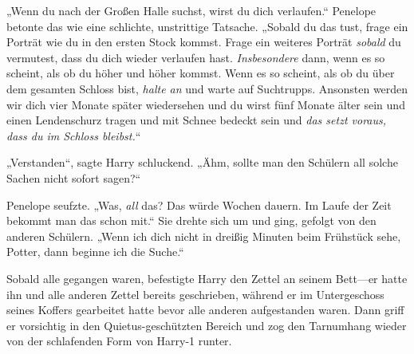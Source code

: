 „Wenn du nach der Großen Halle suchst, wirst du dich verlaufen.“ Penelope betonte das wie eine schlichte, unstrittige Tatsache. „Sobald du das tust, frage ein Porträt wie du in den ersten Stock kommst. Frage ein weiteres Porträt \emph{sobald} du vermutest, dass du dich wieder verlaufen hast. \emph{Insbesondere} dann, wenn es so scheint, als ob du höher und höher kommst. Wenn es so scheint, als ob du über dem gesamten Schloss bist, \emph{halte an} und warte auf Suchtrupps. Ansonsten werden wir dich vier Monate später wiedersehen und du wirst fünf Monate älter sein und einen Lendenschurz tragen und mit Schnee bedeckt sein und \emph{das setzt voraus, dass du \emph{im} Schloss bleibst.}“

„Verstanden“, sagte Harry schluckend. „Ähm, sollte man den Schülern all solche Sachen nicht sofort sagen?“

Penelope seufzte. „Was, \emph{all} das? Das würde Wochen dauern. Im Laufe der Zeit bekommt man das schon mit.“ Sie drehte sich um und ging, gefolgt von den anderen Schülern. „Wenn ich dich nicht in dreißig Minuten beim Frühstück sehe, Potter, dann beginne ich die Suche.“

Sobald alle gegangen waren, befestigte Harry den Zettel an seinem Bett—er hatte ihn und alle anderen Zettel bereits geschrieben, während er im Untergeschoss seines Koffers gearbeitet hatte bevor alle anderen aufgestanden waren. Dann griff er vorsichtig in den Quietus-geschützten Bereich und zog den Tarnumhang wieder von der schlafenden Form von Harry-1 runter.

